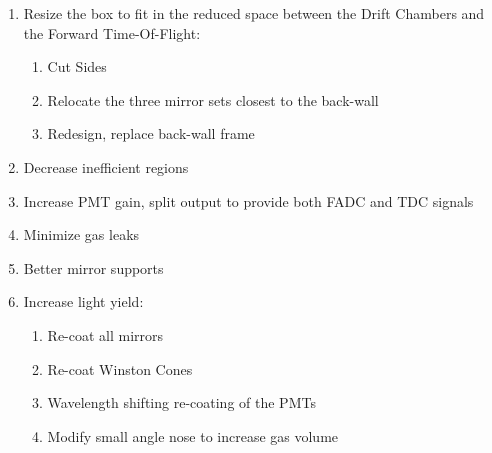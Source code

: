\begin{enumerate}
\item Resize the box to fit in the reduced space between the Drift Chambers and the Forward Time-Of-Flight:
	\begin{enumerate}
		\item Cut Sides
		\item Relocate the three mirror sets closest to the back-wall
		\item Redesign, replace back-wall frame
	\end{enumerate}

	\item Decrease inefficient regions
	\item Increase PMT gain, split output to provide both FADC and TDC signals
	\item Minimize gas leaks
	\item Better mirror supports
	\item Increase light yield:
	\begin{enumerate}
		\item Re-coat all mirrors
		\item Re-coat Winston Cones
		\item Wavelength shifting re-coating of the PMTs
		\item Modify small angle nose to increase gas volume
	\end{enumerate}
\end{enumerate}








